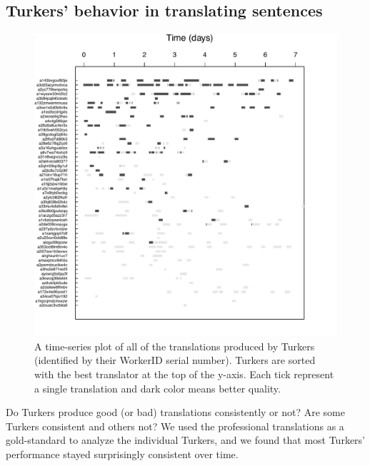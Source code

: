 \documentclass[11pt,letterpaper]{article}
\begin{document}

\subsection{Turkers' behavior in translating sentences}



\begin{figure}[h!]
  \centering
  \includegraphics[width=\linewidth]{WorkerPerf/wp.pdf}
  \caption{A time-series plot of all of the translations produced by Turkers (identified by their WorkerID serial number). Turkers are sorted with the best translator at the top of the y-axis. Each tick represent a single translation and dark color means better quality.
}
    \label{fworkerperf}
\end{figure}

Do Turkers produce good (or bad) translations consistently or not? Are some Turkers  consistent and others not? We used the professional translations as a gold-standard to analyze the individual Turkers, and we found that most Turkers' performance stayed surprisingly consistent over time. 
\end{document}

